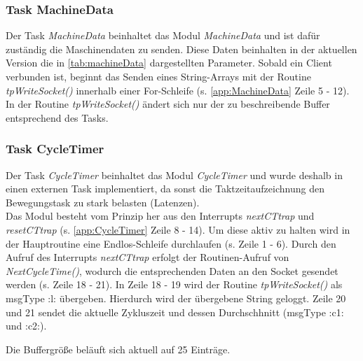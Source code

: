 

\subsubsection{Task MachineData}
Der Task \textit{MachineData} beinhaltet das Modul \textit{MachineData} und ist 
dafür zuständig die Maschinendaten zu senden. Diese Daten beinhalten in der 
aktuellen Version die in \ref{tab:machineData} dargestellten Parameter. Sobald 
ein Client verbunden ist, beginnt das Senden eines String-Arrays mit der 
Routine \textit{tpWriteSocket()} innerhalb einer For-Schleife (s. 
\ref{app:MachineData} Zeile 5 - 12). In der Routine \textit{tpWriteSocket()} 
ändert sich nur der zu beschreibende Buffer entsprechend des Tasks.



\subsubsection{Task CycleTimer}
Der Task \textit{CycleTimer} beinhaltet das Modul \textit{CycleTimer} und wurde 
deshalb in einen externen Task implementiert, da sonst die Taktzeitaufzeichnung 
den Bewegungstask zu stark belasten (Latenzen).\\
Das Modul besteht vom Prinzip her aus den Interrupts \textit{nextCTtrap} und 
\textit{resetCTtrap} (s. \ref{app:CycleTimer} Zeile 8 - 14). Um diese aktiv zu 
halten wird in der Hauptroutine eine Endlos-Schleife durchlaufen (s. Zeile 1 - 
6). Durch den Aufruf des Interrupts \textit{nextCTtrap} erfolgt der 
Routinen-Aufruf von \textit{NextCycleTime()}, wodurch die entsprechenden Daten 
an den Socket gesendet werden (s. Zeile 18 - 21). In Zeile 18 - 19 wird der 
Routine \textit{tpWriteSocket()} als msgType :l: übergeben. Hierdurch wird der 
übergebene String geloggt. Zeile 20 und 21 sendet die aktuelle Zykluszeit und 
dessen Durchschhnitt (msgType :c1: und :c2:).



Die Buffergröße beläuft sich aktuell auf 25 Einträge.